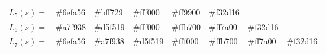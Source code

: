 \begin{table}[h]
\begin{tabular}{@{}llllllll@{}}
\multicolumn{1}{l|}{$L_5(s) = $} & \multicolumn{1}{l|}{\cellcolor[HTML]{6EFA56}\#6efa56} & \multicolumn{1}{l|}{\cellcolor[HTML]{BFF729}\#bff729} & \multicolumn{1}{l|}{\cellcolor[HTML]{FFF000}\#fff000} & \multicolumn{1}{l|}{\cellcolor[HTML]{F98E0B}\#ff9900} & \multicolumn{1}{l|}{\cellcolor[HTML]{F32D16}\#f32d16} &                                                       &                                                       \\ \cmidrule(lr){2-7}
\multicolumn{1}{l|}{$L_6(s) = $} & \multicolumn{1}{l|}{\cellcolor[HTML]{A7F938}\#a7f938} & \multicolumn{1}{l|}{\cellcolor[HTML]{D5F519}\#d5f519} & \multicolumn{1}{l|}{\cellcolor[HTML]{FFF000}\#fff000} & \multicolumn{1}{l|}{\cellcolor[HTML]{FFB700}\#ffb700} & \multicolumn{1}{l|}{\cellcolor[HTML]{FF7A00}\#ff7a00} & \multicolumn{1}{l|}{\cellcolor[HTML]{F32D16}\#f32d16} &                                                       \\ \cmidrule(l){2-8} 
\multicolumn{1}{l|}{$L_7(s) = $} & \multicolumn{1}{l|}{\cellcolor[HTML]{6EFA56}\#6efa56} & \multicolumn{1}{l|}{\cellcolor[HTML]{A7F938}\#a7f938} & \multicolumn{1}{l|}{\cellcolor[HTML]{D5F519}\#d5f519} & \multicolumn{1}{l|}{\cellcolor[HTML]{FFF000}\#fff000} & \multicolumn{1}{l|}{\cellcolor[HTML]{FFB700}\#ffb700} & \multicolumn{1}{l|}{\cellcolor[HTML]{FF7A00}\#ff7a00} & \multicolumn{1}{l|}{\cellcolor[HTML]{F32D16}\#f32d16} \\ \bottomrule
\end{tabular}
\end{table}


